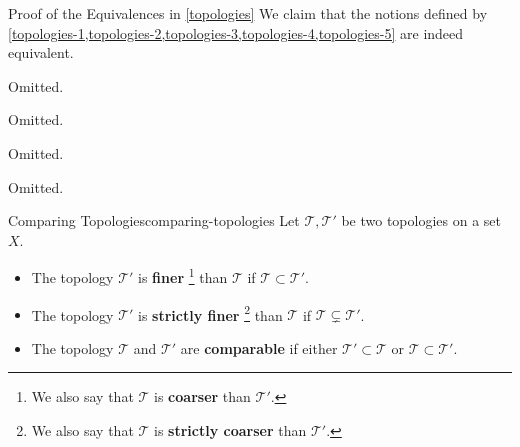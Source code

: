 \begin{Proof}{Proof of the Equivalences in \cref{topologies}}%
    We claim that the notions defined by \cref{topologies-1,topologies-2,topologies-3,topologies-4,topologies-5} are indeed equivalent.

    Omitted.

    Omitted.

    Omitted.

    Omitted.
\end{Proof}
\begin{definition}{Comparing Topologies}{comparing-topologies}%
    Let $\mathcal{T},\mathcal{T}'$ be two topologies on a set $X$.%
    \begin{itemize}
        \item\label{comparing-topologies-1}The topology $\mathcal{T}'$ is \textbf{finer}%
            \footnote{%
                We also say that $\mathcal{T}$ is \textbf{coarser} than $\mathcal{T}'$.
            } %
            than $\mathcal{T}$ if $\mathcal{T}\subset\mathcal{T}'$.
        \item\label{comparing-topologies-2}The topology $\mathcal{T}'$ is \textbf{strictly finer}%
            \footnote{%
                We also say that $\mathcal{T}$ is \textbf{strictly coarser} than $\mathcal{T}'$.
                \par\vspace*{-1.75\baselineskip}
            } %
            than $\mathcal{T}$ if $\mathcal{T}\subsetneq\mathcal{T}'$.
        \item\label{comparing-topologies-3}The topology $\mathcal{T}$ and $\mathcal{T}'$ are \textbf{comparable} if either $\mathcal{T}'\subset\mathcal{T}$ or $\mathcal{T}\subset\mathcal{T}'$.
    \end{itemize}
\end{definition}
